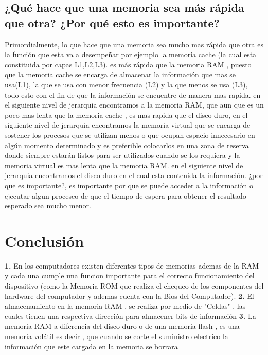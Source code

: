 \documentclass{article}
\begin{document}
\subsection{¿Qué hace que una memoria sea más rápida que otra? ¿Por qué esto es importante?}
\newline
Primordialmente, lo que hace que una memoria sea mucho mas rápida que otra es la función que esta va a desempeñar por ejemplo la memoria cache (la cual esta constituida por capas L1,L2,L3). es más rápida que la memoria RAM , puesto que la memoria cache se encarga de almacenar la información que mas se usa(L1), la que se usa con menor frecuencia (L2) y la que menos se usa (L3), todo esto con el fin de que la información se encuentre de manera mas rapida.
en el siguiente nivel de jerarquia encontramos a la memoria RAM, que aun que es un poco mas lenta que la memoria cache , es mas rapida que el disco duro, en el siguiente nivel de jerarquia encontramos la memoria virtual que se encarga de sostener los procesos que se utilizan menos o que ocupan espacio innecesario en algún momento determinado y es preferible colocarlos en una zona de reserva donde siempre estarán listos para ser utilizados cuando se los requiera y la memoria virtual es mas lenta que la memoria RAM. en el siguiente nivel de jerarquia encontramos el disco duro en el cual esta contenida la información.
\newline
¿por que es importante?, es importante por que se puede acceder a la información o ejecutar algun proceseo de que el tiempo de espera para obtener el resultado esperado sea mucho menor.

\section{Conclusión} \label{conclulsion}
\newline
\textbf{1.} En los computadores existen diferentes tipos de memorias ademas de la RAM y cada una cumple una funcion importante para el correcto funcionamiento del dispositivo (como la Memoria ROM que realiza el chequeo de los componentes del hardware del computador y ademas cuenta con la Bios del Computador).
\newline
\newline
\textbf{2.} El almacenamiento en la memoria RAM , se realiza por medio de "Celdas" , las cuales tienen una respectiva dirección para almacener bits de información
\newline
\newline
\textbf{3.} La memoria RAM a diferencia del disco duro o de una memoria flash , es una memoria volátil es decir , que cuando se corte el suministro electrico la información que este cargada en la memoria se borrara


\end{document}

